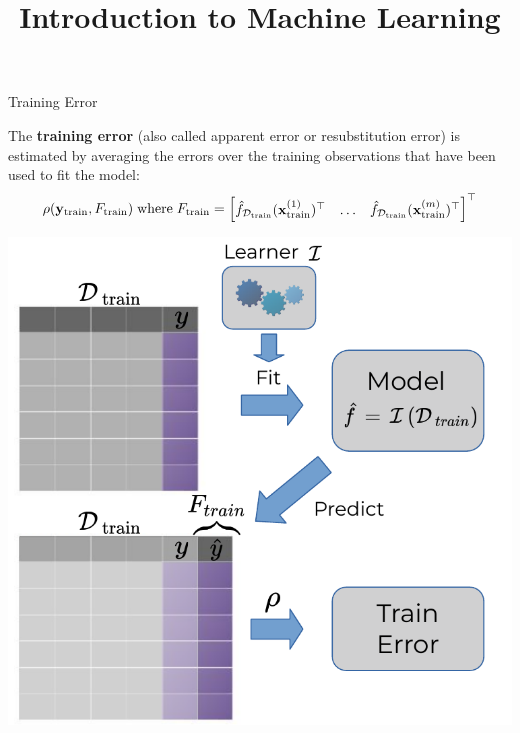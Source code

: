 \documentclass[11pt,compress,t,notes=noshow, xcolor=table]{beamer}
\title{Introduction to Machine Learning}
\institute{\href{https://compstat-lmu.github.io/lecture_i2ml/}{compstat-lmu.github.io/lecture\_i2ml}}
\date{}
\begin{document}







\begin{vbframe}{Training Error}

The \textbf{training error} (also called apparent error or resubstitution error)
is estimated by averaging the errors over the training observations that have 
been used to fit the model:
\small
$$\rho(\yv_{\mathrm{train}}, F_{\textrm{train}})\;\text{where}\; F_{\textrm{train}} = 
\begin{bmatrix} \fhDtrain(\xi[1]_{\textrm{train}})^\top & \dots & \fhDtrain(\xi[m]_{\textrm{train}})^\top \end{bmatrix}^\top$$ 

\begin{center}
\includegraphics[width=.45\textwidth]{figure_man/train_error.pdf}
\end{center}

\end{vbframe}

\end{document}

